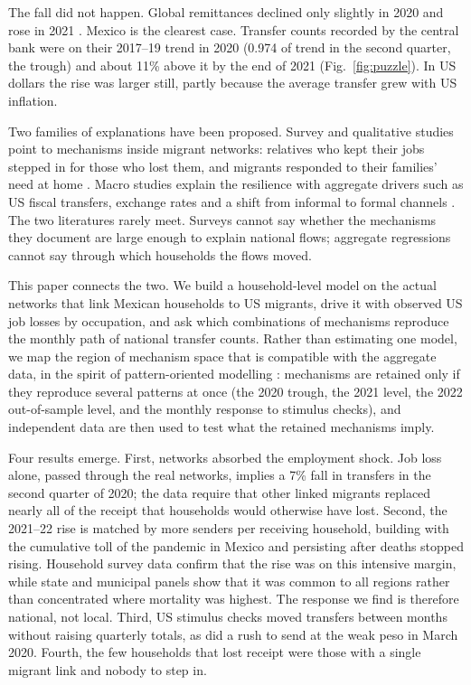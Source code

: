\documentclass[11pt]{article}
\begin{document}
The fall did not happen. Global remittances declined only slightly in 2020 and rose in 2021 \citep{ratha2021brief34,kpodar2023}. Mexico is the clearest case. Transfer counts recorded by the central bank \citep{banxico} were on their 2017--19 trend in 2020 (0.974 of trend in the second quarter, the trough) and about 11\% above it by the end of 2021 (Fig.~\ref{fig:puzzle}). In US dollars the rise was larger still, partly because the average transfer grew with US inflation.

Two families of explanations have been proposed. Survey and qualitative studies point to mechanisms inside migrant networks: relatives who kept their jobs stepped in for those who lost them, and migrants responded to their families' need at home \citep{garip2016,massey2002}. Macro studies explain the resilience with aggregate drivers such as US fiscal transfers, exchange rates and a shift from informal to formal channels \citep{kpodar2023}. The two literatures rarely meet. Surveys cannot say whether the mechanisms they document are large enough to explain national flows; aggregate regressions cannot say through which households the flows moved.

This paper connects the two. We build a household-level model on the actual networks that link Mexican households to US migrants, drive it with observed US job losses by occupation, and ask which combinations of mechanisms reproduce the monthly path of national transfer counts. Rather than estimating one model, we map the region of mechanism space that is compatible with the aggregate data, in the spirit of pattern-oriented modelling \citep{grimm2005}: mechanisms are retained only if they reproduce several patterns at once (the 2020 trough, the 2021 level, the 2022 out-of-sample level, and the monthly response to stimulus checks), and independent data are then used to test what the retained mechanisms imply.

Four results emerge. First, networks absorbed the employment shock. Job loss alone, passed through the real networks, implies a 7\% fall in transfers in the second quarter of 2020; the data require that other linked migrants replaced nearly all of the receipt that households would otherwise have lost. Second, the 2021--22 rise is matched by more senders per receiving household, building with the cumulative toll of the pandemic in Mexico and persisting after deaths stopped rising. Household survey data confirm that the rise was on this intensive margin, while state and municipal panels show that it was common to all regions rather than concentrated where mortality was highest. The response we find is therefore national, not local. Third, US stimulus checks moved transfers between months without raising quarterly totals, as did a rush to send at the weak peso in March 2020. Fourth, the few households that lost receipt were those with a single migrant link and nobody to step in.
\end{document}

